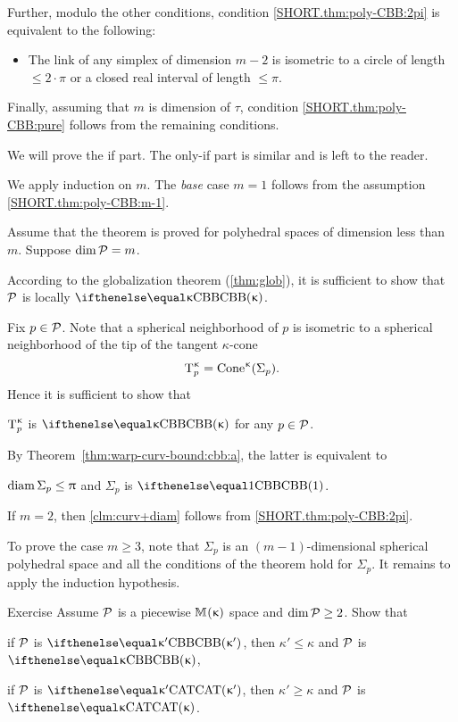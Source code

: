 Further, modulo the other conditions,
 condition \ref{SHORT.thm:poly-CBB:2pi}
is equivalent to the following:


\begin{itemize}
\item[\ref{SHORT.thm:poly-CBB:2pi}\,$'$] 
The link of any simplex of dimension $m-2$ is 
isometric to a circle of length $\le 2\cdot\pi$
or a closed real interval of length $\le \pi$.
\end{itemize}

Finally, assuming that $m$ is dimension of $\tau$,
condition \ref{SHORT.thm:poly-CBB:pure} follows from the remaining conditions.

We will prove the if part.
The only-if part is similar and is left to the reader.

We apply induction on $m$.
The {}\emph{base} case $m=1$ follows from the assumption \ref{SHORT.thm:poly-CBB:m-1}.

Assume that the theorem is proved for polyhedral spaces  of dimension less than $m$.
Suppose  $\mathop{\rm dim}\nolimits\mathcal{P}=m$.

According to the globalization theorem (\ref{thm:glob}),
it is sufficient to show that 
$\mathcal{P}$  is locally $\Alex\kappa$. 

Fix $p\in \spc{P}$.
Note that a spherical neighborhood of $p$
is isometric
to a  spherical neighborhood of the tip of the tangent $\kappa$-cone 
$$\T_p\mc\kappa\z
=
\Cone\mc\kappa(\Sigma_p).$$
Hence it is sufficient to show that 
\begin{clm}{}
 $\text{\rm T}_p^{\upkappa}$ is $\Alex\kappa$ for any $p\in \spc{P}$.
\end{clm}

By Theorem~\ref{thm:warp-curv-bound:cbb:a}, 
the latter is equivalent to 
\begin{clm}{}\label{clm:curv+diam}
$\diam\Sigma_p\le \pi$ and $\Sigma_p$ is $\Alex1$.
\end{clm}


If $m=2$, then \ref{clm:curv+diam} follows from \ref{SHORT.thm:poly-CBB:2pi}.

To prove the case $m\ge 3$,
note that $\Sigma_p$ is an $(m-1)$-dimensional spherical polyhedral space and all the conditions of the theorem hold for $\Sigma_p$.
It remains to apply the induction hypothesis.\qeds

\begin{thm}{Exercise}\label{ex:polyKk}
Assume $\mathcal{P}$ is a piecewise
$\mathbb{M}_{{}}^{}({\upkappa})$ space and $\dim \spc{P}\ge 2$. 
Show that 

\begin{subthm}{} if $\mathcal{P}$ is $\Alex{\kappa'}$, then $\kappa'\le \kappa$ and $\mathcal{P}$ is $\Alex{\kappa}$, 
\end{subthm}

\begin{subthm}{}
if $\mathcal{P}$ is $\CAT{\kappa'}$, then $\kappa'\ge \kappa$ and $\mathcal{P}$ is $\CAT\kappa$.
\end{subthm}

\end{thm}

